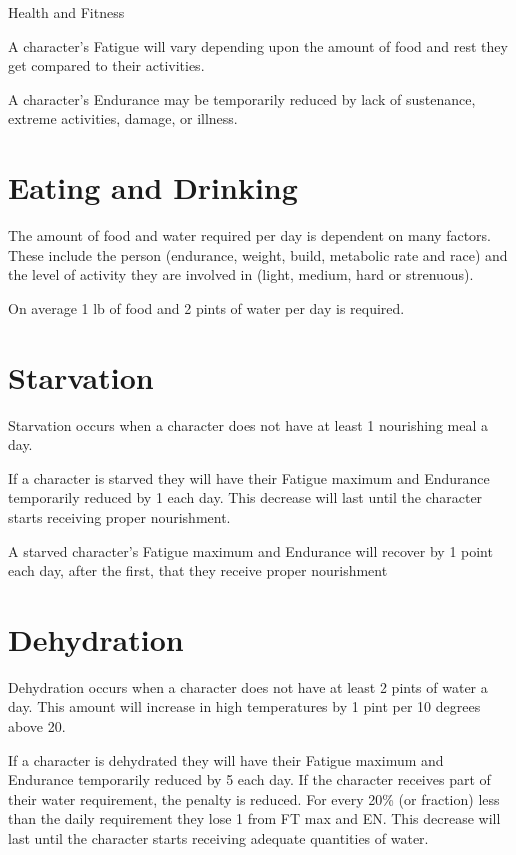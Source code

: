 \begin{Chapter}{Health and Fitness}

A character’s Fatigue will vary depending upon the amount of food and
rest they get compared to their activities.

A character’s Endurance may be temporarily reduced by lack of
sustenance, extreme activities, damage, or illness.

\section{Eating and Drinking}

The amount of food and water required per day is dependent on many
factors.  These include the person (endurance, weight, build,
metabolic rate and race) and the level of activity they are involved
in (light, medium, hard or strenuous).

On average 1 lb of food and 2 pints of water per day is required.


\section{Starvation}

Starvation occurs when a character does not have at least 1 nourishing
meal a day.

If a character is starved they will have their Fatigue maximum and
Endurance temporarily reduced by 1 each day. This decrease will last
until the character starts receiving proper nourishment.

A starved character’s Fatigue maximum and Endurance will recover by
1 point each day, after the first, that they receive proper
nourishment


\section{Dehydration}

Dehydration occurs when a character does not have at least 2 pints of
water a day.  This amount will increase in high temperatures by 1 pint
per 10 degrees above 20.

If a character is dehydrated they will have their Fatigue maximum and
Endurance temporarily reduced by 5 each day.  If the character
receives part of their water requirement, the penalty is reduced.
For every 20\% (or fraction) less than the daily requirement they lose
1 from FT max and EN. This decrease will last until the character
starts receiving adequate quantities of water.


\end{Chapter}
